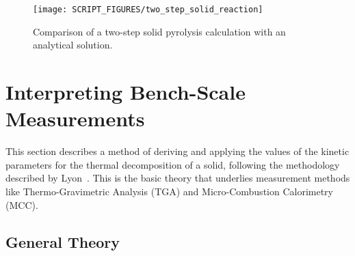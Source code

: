 \documentclass[11pt]{book}
\begin{document}
\begin{figure}[!htb]
\centering
\texttt{[image: SCRIPT\_FIGURES/two\_step\_solid\_reaction]}
\caption[The  test case]{Comparison of a two-step solid pyrolysis calculation with an analytical solution.}
\label{fig:two_step_solid_reaction}
\end{figure}




\section{Interpreting Bench-Scale Measurements}
\label{solid_kinetics}

This section describes a method of deriving and applying the values of the kinetic parameters for the thermal decomposition of a solid, following the methodology described by Lyon~\cite{Lyon:FM2000}. This is the basic theory that underlies measurement methods like Thermo-Gravimetric Analysis (TGA) and Micro-Combustion Calorimetry (MCC).


\subsection{General Theory}
\end{document}
